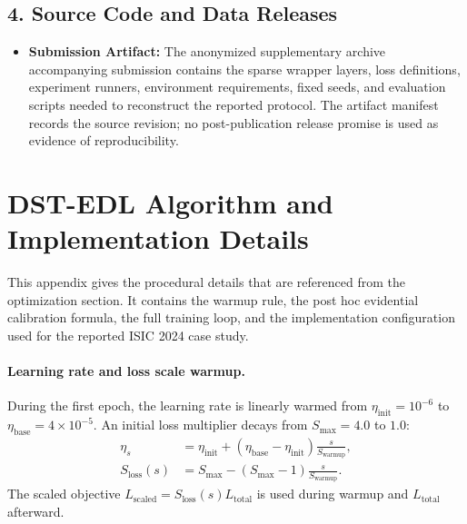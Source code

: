 \documentclass[letterpaper]{article}
\begin{document}
\subsection*{4. Source Code and Data Releases}
\begin{itemize}
    \item \textbf{Submission Artifact:} The anonymized supplementary archive accompanying submission contains the sparse wrapper layers, loss definitions, experiment runners, environment requirements, fixed seeds, and evaluation scripts needed to reconstruct the reported protocol. The artifact manifest records the source revision; no post-publication release promise is used as evidence of reproducibility.
\end{itemize}

\section{DST-EDL Algorithm and Implementation Details}
\label{app:algorithm}
This appendix gives the procedural details that are referenced from the
optimization section. It contains the warmup rule, the post hoc evidential
calibration formula, the full training loop, and the implementation
configuration used for the reported ISIC 2024 case study.

\paragraph{Learning rate and loss scale warmup.}
During the first epoch, the learning rate is linearly warmed from $\eta_{\text{init}}=10^{-6}$ to $\eta_{\text{base}}=4\times10^{-5}$. An initial loss multiplier decays from $S_{\max}=4.0$ to $1.0$:
\begin{equation}\label{eq:warmup_main}
\begin{aligned}
    \eta_s&=\eta_{\text{init}}
    +(\eta_{\text{base}}-\eta_{\text{init}})
    \frac{s}{S_{\text{warmup}}},\\
    S_{\text{loss}}(s)&=S_{\max}
    -(S_{\max}-1)\frac{s}{S_{\text{warmup}}}.
\end{aligned}
\end{equation}
The scaled objective $L_{\text{scaled}}=S_{\text{loss}}(s)L_{\text{total}}$ is used during warmup and $L_{\text{total}}$ afterward.
\end{document}
